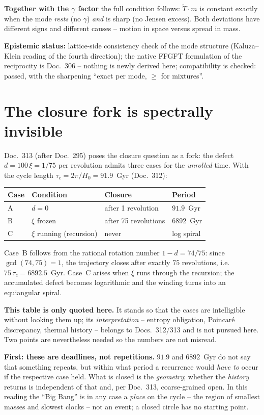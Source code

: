 \textbf{Together with the $\gamma$ factor} the full condition
follows: $\tilde T\cdot m$ is constant exactly when the mode
\emph{rests} (no $\gamma$) \emph{and} is sharp (no Jensen excess).
Both deviations have different signs and different causes --
motion in space versus spread in mass.

\textbf{Epistemic status:} lattice-side consistency check of the
mode structure (Kaluza--Klein reading of the fourth direction);
the native FFGFT formulation of the reciprocity is Doc.~306 --
nothing is newly derived here; compatibility is checked: passed,
with the sharpening \enquote{exact per mode, $\ge$ for
mixtures}.

\section{The closure fork is spectrally invisible}

Doc.~313 (after Doc.~295) poses the closure question as a fork:
the defect $d = 100\,\xi = 1/75$ per revolution admits three cases
for the \emph{unrolled} time. With the cycle length
$\tau_c = 2\pi/H_0 = 91.9$~Gyr (Doc.~312):

\begin{center}
\begin{tabular}{llll}
\toprule
Case & Condition & Closure & Period \\
\midrule
A & $d = 0$ & after 1 revolution & $91.9$~Gyr \\
B & $\xi$ frozen & after 75 revolutions & $6892$~Gyr \\
C & $\xi$ running (recursion) & never & log spiral \\
\bottomrule
\end{tabular}
\end{center}

\noindent Case~B follows from the rational rotation number
$1-d = 74/75$: since $\gcd(74,75) = 1$, the trajectory closes
after exactly $75$ revolutions, i.e.\ $75\,\tau_c = 6892.5$~Gyr.
Case~C arises when $\xi$ runs through the recursion; the
accumulated defect becomes logarithmic and the winding turns into
an equiangular spiral.

\textbf{This table is only quoted here.} It stands so that the
cases are intelligible without looking them up; its
\emph{interpretation} -- entropy obligation, Poincaré discrepancy,
thermal history -- belongs to Docs.~312/313 and is not pursued
here. Two points are nevertheless needed so the numbers are not
misread.

\textbf{First: these are deadlines, not repetitions.} $91.9$ and
$6892$~Gyr do not say that something repeats, but within what
period a recurrence would \emph{have to} occur if the respective
case held. What is closed is the \emph{geometry}; whether the
\emph{history} returns is independent of that and, per Doc.~313,
coarse-grained open. In this reading the \enquote{Big Bang} is in
any case a \emph{place} on the cycle -- the region of smallest
masses and slowest clocks -- not an event; a closed circle has no
starting point.

